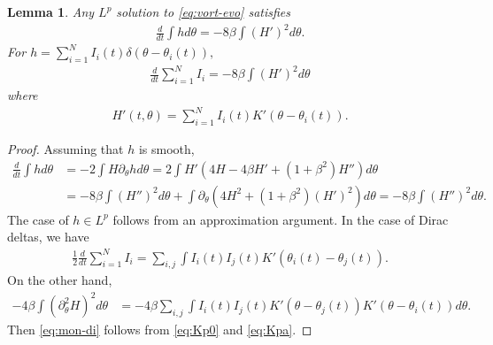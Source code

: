 \documentclass[10pt]{article}
\newtheorem{lemma}[theorem]{Lemma}
\theoremstyle{definition}
\theoremstyle{remark}
\numberwithin{equation}{section}
\newcommand{\rd}{\partial}
\newcommand{\0}{\emptyset}
\newcommand{\bt}{\beta}
\newcommand{\dlt}{\delta}
\newcommand{\tht}{\theta}
\begin{document}
	\begin{lemma}\label{lem:mon}
		Any $L^p$ solution to \eqref{eq:vort-evo} satisfies \begin{equation}\label{eq:mon}
			\begin{split}
				\frac{d}{dt} \int h d\tht = -8\bt \int (H')^2 d\tht. 
			\end{split}
		\end{equation} For $h = \sum_{i=1}^{N} I_i(t) \dlt(\tht-\tht_i(t)), $ \begin{equation}\label{eq:mon-di}
			\begin{split}
				\frac{d}{dt}  \sum_{i=1}^{N} I_{i}  = - 8\bt \int (H')^2 d\tht
			\end{split}
		\end{equation} where \begin{equation*}
			\begin{split}
				H'(t,\tht) = \sum_{i=1}^{N} I_i(t) K'(\tht-\tht_i(t)).
			\end{split}
		\end{equation*}
	\end{lemma}
	\begin{proof}
		Assuming that $h$ is smooth, 
		\begin{equation*}
			\begin{split}
				\frac{d}{dt} \int h d\tht & = -2 \int H\rd_\tht h d\tht = 2\int  H' ( 4H - 4\bt  H' + (1+\bt^2) H'' ) d\tht \\
				& = -8\bt \int (H'')^2 d\tht + \int \rd_\tht \left(  4H^2 + (1+\bt^2) (H')^2  \right) d\tht  = -8\bt \int (H'')^2 d\tht. 
			\end{split}
		\end{equation*} The case of $h\in L^p$ follows from an approximation argument. In the case of Dirac deltas, we have 
		\begin{equation*}
			\begin{split}
				\frac12 \frac{d}{dt} \sum_{i=1}^{N} I_{i} = \sum_{i,j} \int I_i(t) I_j(t) K'(\tht_i(t)-\tht_j(t)). 
			\end{split}
		\end{equation*} On the other hand, \begin{equation*}
			\begin{split}
				-4\bt \int (\partial^2_{\theta} H)^2 d\tht & = -4\bt \sum_{i,j} \int I_i(t)I_j(t) K'(\tht-\tht_j(t))K'(\tht-\tht_i(t)) d\tht . 
			\end{split}
		\end{equation*} Then \eqref{eq:mon-di} follows from \eqref{eq:Kp0} and \eqref{eq:Kpa}. 
	\end{proof}
	
\end{document}
